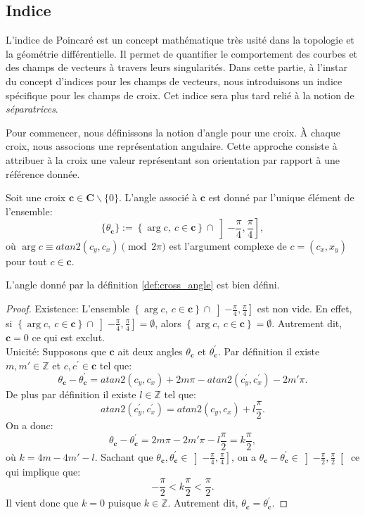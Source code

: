 \subsection{Indice}

L'indice de Poincaré est un concept mathématique très usité dans la topologie et la géométrie différentielle. Il permet de quantifier le comportement des courbes et des champs de vecteurs à travers leurs singularités. Dans cette partie, à l'instar du concept d'indices pour les champs de vecteurs, nous introduisons un indice spécifique pour les champs de croix. Cet indice sera plus tard relié à la notion de \emph{séparatrices}.

Pour commencer, nous définissons la notion d'angle pour une croix. À chaque croix, nous associons une représentation angulaire. Cette approche consiste à attribuer à la croix une valeur représentant son orientation par rapport à une référence donnée.

\begin{definition}
    \label{def:cross_angle}
    Soit une croix $\mathbf{c}\in\mathbf{C}\backslash\{0\}$. L'angle associé à $\mathbf{c}$ est donné par l'unique élément de l'ensemble:
    $$\{\theta_{\mathbf{c}}\} := \left\{\arg c,~c\in \mathbf{c}\right\} \cap \left]-\frac{\pi}{4},\frac{\pi}{4}\right],$$
    où $\arg c\equiv atan2(c_y, c_x)\pmod{2\pi}$ est l'argument complexe de $c=(c_x, x_y)$ pour tout $c\in\mathbf{c}$.
\end{definition}

\begin{lemma}
    L'angle donné par la définition \ref{def:cross_angle} est bien défini.
\end{lemma}

\begin{proof}
    Existence: L'ensemble $\left\{\arg c,~c\in \mathbf{c}\right\} \cap \left]-\frac{\pi}{4},\frac{\pi}{4}\right]$ est non vide. En effet, si $\left\{\arg c,~c\in \mathbf{c}\right\} \cap \left]-\frac{\pi}{4},\frac{\pi}{4}\right]=\emptyset$, alors $\left\{\arg c,~c\in \mathbf{c}\right\}=\emptyset$. Autrement dit, $\mathbf{c}=0$ ce qui est exclut.\\
    Unicité: Supposons que $\mathbf{c}$ ait deux angles $\theta_{\mathbf{c}}$ et $\theta^{'}_{\mathbf{c}}$. Par définition il existe $m, m'\in\mathbb{Z}$ et $c,c^{'}\in\mathbf{c}$ tel que:
    $$
    \theta_{\mathbf{c}}-\theta^{'}_{\mathbf{c}}=atan2(c_y, c_x)+2m\pi-atan2(c^{'}_y, c^{'}_x)-2m'\pi.
    $$
    De plus par définition il existe $l\in\mathbb{Z}$ tel que:
    $$
    atan2(c^{'}_y,c^{'}_x)=atan2(c_y,c_x)+l\frac{\pi}{2}.
    $$
    On a donc:
    $$
    \theta_{\mathbf{c}}-\theta^{'}_{\mathbf{c}}=2m\pi-2m'\pi-l\frac{\pi}{2}=k\frac{\pi}{2},
    $$
    où $k=4m-4m'-l$.
    Sachant que $\theta_{\mathbf{c}},\theta_{\mathbf{c}}^{'}\in\left]-\frac{\pi}{4},\frac{\pi}{4}\right]$, on a $\theta_{\mathbf{c}}-\theta^{'}_{\mathbf{c}}\in\left]-\frac{\pi}{2},\frac{\pi}{2}\right[$ ce qui implique que:
    $$
    -\frac{\pi}{2}<k\frac{\pi}{2}<\frac{\pi}{2}.
    $$
    Il vient donc que $k=0$ puisque $k\in\mathbb{Z}$. Autrement dit, $\theta_{\mathbf{c}}=\theta_{\mathbf{c}}^{'}$.
\end{proof}

